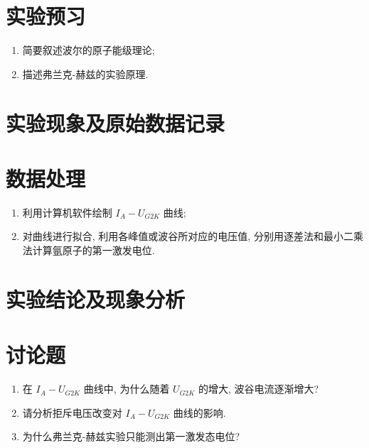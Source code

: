 \documentclass[signature=data]{physicsreport}
\begin{document}
\maketitle

\section{实验预习}
\begin{enumerate}
    \item 简要叙述波尔的原子能级理论;
    \item 描述弗兰克-赫兹的实验原理.
\end{enumerate}

\makeatletter
{}
\makeatother

\newpage
\section{实验现象及原始数据记录}

\makeatletter
{}
\makeatother

\newpage
\section{数据处理}
\begin{enumerate}
    \item 利用计算机软件绘制 $I_A-U_{G2K}$ 曲线;
    \item 对曲线进行拟合, 利用各峰值或波谷所对应的电压值, 分别用逐差法和最小二乘法计算氩原子的第一激发电位.
\end{enumerate}

\vspace*{30em}
\section{实验结论及现象分析}

\newpage
\section{讨论题}
\begin{enumerate}
    \item 在 $I_A-U_{G2K}$ 曲线中, 为什么随着 $U_{G2K}$ 的增大, 波谷电流逐渐增大?
    \item 请分析拒斥电压改变对 $I_A-U_{G2K}$ 曲线的影响.
    \item 为什么弗兰克-赫兹实验只能测出第一激发态电位?
\end{enumerate}
\end{document}
